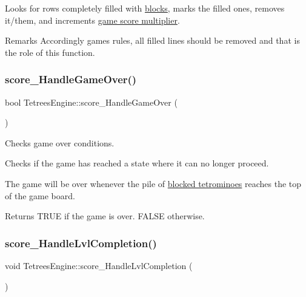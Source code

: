 Looks for rows completely filled with \hyperlink{TetreesDefs_8hpp_ad8f0654cf997b7ea7eb14924d0b1ea33}{blocks}, marks the filled ones, removes it/them, and increments \hyperlink{structgame__score__t}{game score multiplier}.

\begin{DoxyRemark}{Remarks}
Accordingly game\textquotesingle{}s rules, all filled lines should be removed and that is the role of this function. 
\end{DoxyRemark}
\mbox{\label{classTetreesEngine_a31898b1228f8b0381a82871669503b34}} 
\subsubsection{\texorpdfstring{score\+\_\+\+Handle\+Game\+Over()}{score\_HandleGameOver()}}
{\footnotesize\ttfamily bool Tetrees\+Engine\+::score\+\_\+\+Handle\+Game\+Over (\begin{DoxyParamCaption}{ }\end{DoxyParamCaption})\hspace{0.3cm}{\ttfamily [private]}}



Checks game over conditions. 

Checks if the game has reached a state where it can no longer proceed.

The game will be over whenever the pile of \hyperlink{classTetreesEngine_a0978ef1f287f00a8ed5a4af2d680b943}{blocked tetrominoes} reaches the top of the game board. \begin{DoxyReturn}{Returns}
{\ttfamily T\+R\+UE} if the game is over. {\ttfamily F\+A\+L\+SE} otherwise. 
\end{DoxyReturn}
\mbox{\label{classTetreesEngine_aa7d501cb6f73111321e1dadbc140ebc8}} 
\subsubsection{\texorpdfstring{score\+\_\+\+Handle\+Lvl\+Completion()}{score\_HandleLvlCompletion()}}
{\footnotesize\ttfamily void Tetrees\+Engine\+::score\+\_\+\+Handle\+Lvl\+Completion (\begin{DoxyParamCaption}{ }\end{DoxyParamCaption})\hspace{0.3cm}{\ttfamily [private]}}



